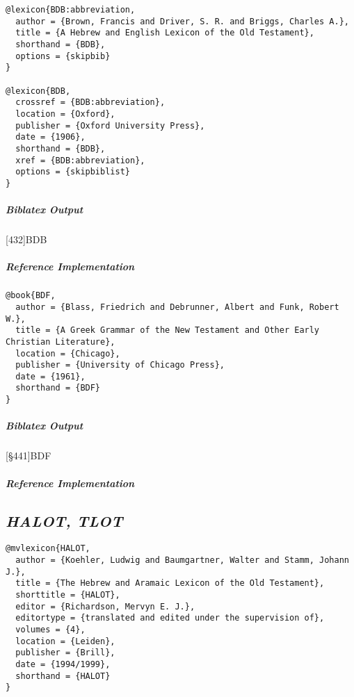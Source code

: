 \documentclass[a4paper]{article}
\newenvironment{biboutput}{%
  \subparagraph{Biblatex Output}
}{\color{black}}
\newenvironment{refimp}{%
  \subparagraph{Reference Implementation}
  \color{reference-colour}
  \rm
}{\par\color{black}}
\begin{document}
\medskip

\begin{lstlisting}
@lexicon{BDB:abbreviation,
  author = {Brown, Francis and Driver, S. R. and Briggs, Charles A.},
  title = {A Hebrew and English Lexicon of the Old Testament},
  shorthand = {BDB},
  options = {skipbib}
}

@lexicon{BDB,
  crossref = {BDB:abbreviation},
  location = {Oxford},
  publisher = {Oxford University Press},
  date = {1906},
  shorthand = {BDB},
  xref = {BDB:abbreviation},
  options = {skipbiblist}
}
\end{lstlisting}

\begin{biboutput}
  [432]{BDB}
\end{biboutput}

\begin{refimp}
\end{refimp}

\medskip

\begin{lstlisting}
@book{BDF,
  author = {Blass, Friedrich and Debrunner, Albert and Funk, Robert W.},
  title = {A Greek Grammar of the New Testament and Other Early Christian Literature},
  location = {Chicago},
  publisher = {University of Chicago Press},
  date = {1961},
  shorthand = {BDF}
}
\end{lstlisting}

\begin{biboutput}
  [§441]{BDF}
\end{biboutput}

\begin{refimp}
\end{refimp}

\subsection{\emph{HALOT, TLOT}}

\begin{lstlisting}
@mvlexicon{HALOT,
  author = {Koehler, Ludwig and Baumgartner, Walter and Stamm, Johann J.},
  title = {The Hebrew and Aramaic Lexicon of the Old Testament},
  shorttitle = {HALOT},
  editor = {Richardson, Mervyn E. J.},
  editortype = {translated and edited under the supervision of},
  volumes = {4},
  location = {Leiden},
  publisher = {Brill},
  date = {1994/1999},
  shorthand = {HALOT}
}
\end{lstlisting}
\end{document}
